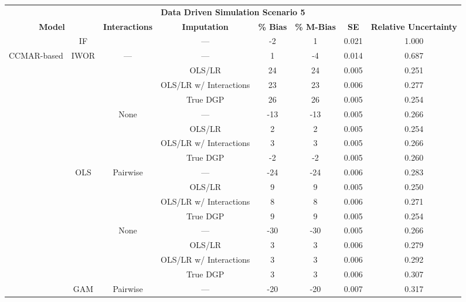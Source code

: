 \begin{table}
\centering
\begin{tabular}[ht]{|>{}c|c|c|c|c|c|c|>{}c|}
\hline
\multicolumn{8}{|c|}{\textbf{Data Driven Simulation Scenario 5}} \\
\cline{1-8}
\multicolumn{2}{|c|}{\textbf{Model}} & \textbf{Interactions} & \textbf{Imputation} & \textbf{\% Bias} & \textbf{\% M-Bias} & \textbf{SE} & \textbf{Relative Uncertainty}\\
\hline
 & IF &  & --- & -2 & 1 & 0.021 & 1.000\\
\cline{2-2}
\cline{4-8}
\multirow{-2}{*}{\centering\arraybackslash CCMAR-based} & IWOR & \multirow{-2}{*}{\centering\arraybackslash ---} & --- & 1 & -4 & 0.014 & 0.687\\
\cline{1-8}
 &  &  & OLS/LR & 24 & 24 & 0.005 & 0.251\\
\cline{4-8}
 &  &  & OLS/LR w/ Interactions & 23 & 23 & 0.006 & 0.277\\
\cline{4-8}
 &  &  & True DGP & 26 & 26 & 0.005 & 0.254\\
\cline{4-8}
 &  & \multirow{-4}{*}{\centering\arraybackslash None} & --- & -13 & -13 & 0.005 & 0.266\\
\cline{3-8}
 &  &  & OLS/LR & 2 & 2 & 0.005 & 0.254\\
\cline{4-8}
 &  &  & OLS/LR w/ Interactions & 3 & 3 & 0.005 & 0.266\\
\cline{4-8}
 &  &  & True DGP & -2 & -2 & 0.005 & 0.260\\
\cline{4-8}
 & \multirow{-8}{*}{\centering\arraybackslash OLS} & \multirow{-4}{*}{\centering\arraybackslash Pairwise} & --- & -24 & -24 & 0.006 & 0.283\\
\cline{2-8}
 &  &  & OLS/LR & 9 & 9 & 0.005 & 0.250\\
\cline{4-8}
 &  &  & OLS/LR w/ Interactions & 8 & 8 & 0.006 & 0.271\\
\cline{4-8}
 &  &  & True DGP & 9 & 9 & 0.005 & 0.254\\
\cline{4-8}
 &  & \multirow{-4}{*}{\centering\arraybackslash None} & --- & -30 & -30 & 0.005 & 0.266\\
\cline{3-8}
 &  &  & OLS/LR & 3 & 3 & 0.006 & 0.279\\
\cline{4-8}
 &  &  & OLS/LR w/ Interactions & 3 & 3 & 0.006 & 0.292\\
\cline{4-8}
 &  &  & True DGP & 3 & 3 & 0.006 & 0.307\\
\cline{4-8}
 & \multirow{-8}{*}{\centering\arraybackslash GAM} & \multirow{-4}{*}{\centering\arraybackslash Pairwise} & --- & -20 & -20 & 0.007 & 0.317\\

\end{tabular}
\end{table}
